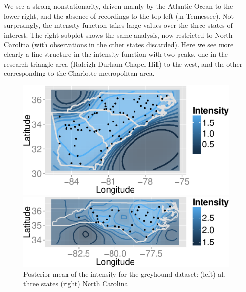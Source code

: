 \documentclass{statsoc}
\begin{document}
We see a strong nonstationarity, driven mainly by the Atlantic Ocean to the lower right, and the absence of recordings to the top left (in Tennessee).
Not surprisingly, the intensity function takes large values over the three states of interest. The right subplot shows the same analysis, now
restricted to North Carolina (with observations in the other states discarded). Here we see more clearly a fine structure in the intensity
function with two peaks, one in the research triangle area (Raleigh-Durham-Chapel Hill) to the west, and the other corresponding to the Charlotte
metropolitan area. 
  \begin{figure}
  \centering
  \begin{minipage}[h]{0.45\linewidth}
  \centering
    \includegraphics[width=0.99\textwidth, angle=0]{figs/greyhound_NCSCGA_intensity.pdf}
  \end{minipage}
  \begin{minipage}[h]{0.48\linewidth}
  \centering
    \includegraphics[width=0.99\textwidth, angle=0]{figs/greyhound_intensity_NC.pdf}
    \vspace{-.3in}
    \caption{Posterior mean of the intensity for the greyhound dataset: (left) all three states (right) North Carolina}
  \label{fig:grey_nc_in}
  \end{minipage}
  \end{figure}
\end{document}

